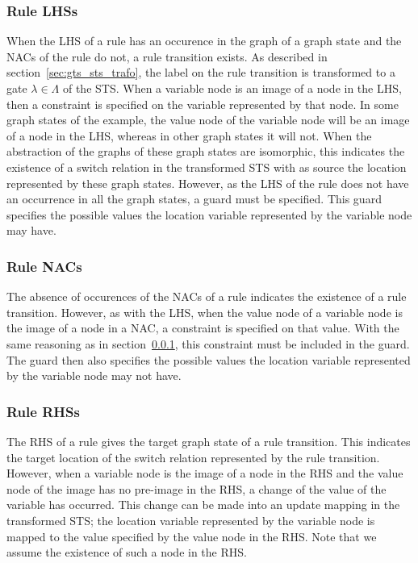 \subsubsection{Rule LHSs}\label{sec:rule_lhss}
When the LHS of a rule has an occurence in the graph of a graph state and the NACs of the rule do not, a rule transition exists. As described in section~\ref{sec:gts_sts_trafo}, the label on the rule transition is transformed to a gate $\lambda \in \Lambda$ of the STS. When a variable node is an image of a node in the LHS, then a constraint is specified on the variable represented by that node. In some graph states of the example, the value node of the variable node will be an image of a node in the LHS, whereas in other graph states it will not. When the abstraction of the graphs of these graph states are isomorphic, this indicates the existence of a switch relation in the transformed STS with as source the location represented by these graph states. However, as the LHS of the rule does not have an occurrence in all the graph states, a guard must be specified. This guard specifies the possible values the location variable represented by the variable node may have.

\subsubsection{Rule NACs}
The absence of occurences of the NACs of a rule indicates the existence of a rule transition. However, as with the LHS, when the value node of a variable node is the image of a node in a NAC, a constraint is specified on that value. With the same reasoning as in section~\ref{sec:rule_lhss}, this constraint must be included in the guard. The guard then also specifies the possible values the location variable represented by the variable node may not have.

\subsubsection{Rule RHSs}
The RHS of a rule gives the target graph state of a rule transition. This indicates the target location of the switch relation represented by the rule transition. However, when a variable node is the image of a node in the RHS and the value node of the image has no pre-image in the RHS, a change of the value of the variable has occurred. This change can be made into an update mapping in the transformed STS; the location variable represented by the variable node is mapped to the value specified by the value node in the RHS. Note that we assume the existence of such a node in the RHS.
